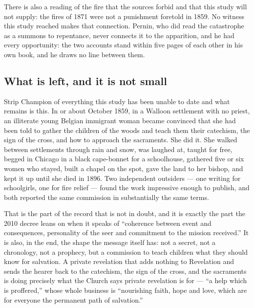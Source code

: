 There is also a reading of the fire that the sources forbid and that
this study will not supply: the fires of 1871 were not a punishment
foretold in 1859. No witness this study reached makes that connection.
Pernin, who did read the catastrophe as a summons to repentance, never
connects it to the apparition, and he had every opportunity: the two
accounts stand within five pages of each other in his own book, and he
draws no line between them.

\subsection{What is left, and it is not small}

Strip Champion of everything this study has been unable to date and
what remains is this. In or about October 1859, in a Walloon
settlement with no priest, an illiterate young Belgian immigrant woman
became convinced that she had been told to gather the children
of the woods and teach them their catechism, the sign of the cross, and
how to approach the sacraments. She did it. She walked between
settlements through rain and snow, was laughed at, taught for free,
begged in Chicago in a black cape-bonnet for a schoolhouse, gathered
five or six women who stayed, built a chapel on the spot, gave the land
to her bishop, and kept it up until she died in 1896. Two independent
outsiders --- one writing for schoolgirls, one for fire relief ---
found the work impressive enough to publish, and both reported the same
commission in substantially the same terms.

That is the part of the record that is not in doubt, and it is exactly
the part the 2010 decree leans on when it speaks of ``coherence between
event and consequences, personality of the seer and commitment to the
mission received.'' It is also, in the end, the shape the message
itself has: not a secret, not a chronology, not a prophecy, but a
commission to teach children what they should know for salvation. A
private revelation that adds nothing to Revelation and sends the
hearer back to the catechism, the sign of the cross, and the sacraments
is doing precisely what the Church says private revelation is for ---
``a help which is proffered,'' whose whole business is ``nourishing
faith, hope and love, which are for everyone the permanent path of
salvation.''

